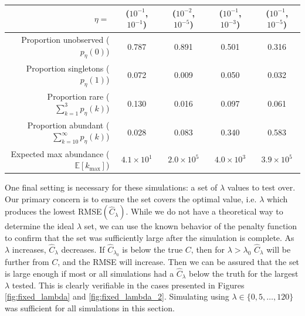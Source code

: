 \documentclass[oupdraft]{bio}
\begin{document}
\begin{table}[t]
\centering
\footnotesize
\begin{tabular}{rcccc}
  \hline
 $\eta = $ & ($10^{-1}$, $10^{-1}$) & ($10^{-2}$, $10^{-5}$) & ($10^{-1}$, $10^{-3}$) & ($10^{-1}$, $10^{-5}$) \\ 
  \hline
  Proportion unobserved ($p_{\eta}(0)$) & 0.787 & 0.891 & 0.501 & 0.316 \\ 
  Proportion singletons ($p_{\eta}(1)$) & 0.072 & 0.009 & 0.050 & 0.032 \\ 
  Proportion rare ($\sum_{k=1}^3 p_{\eta}(k)$) & 0.130 & 0.016 & 0.097 & 0.061 \\ 
  Proportion abundant ($\sum_{k=10}^{\infty} p_{\eta}(k)$) & 0.028 & 0.083 & 0.340 & 0.583 \\ 
Expected max abundance ($\mathbb{E}\left[k_{\text{max}}\right]$) & $4.1 \times 10^{1}$ & $2.0 \times 10^{5}$ & $4.0 \times 10^{3}$ & $3.9 \times 10^{5}$ \\ 
   \hline
\end{tabular}
\normalsize
\end{table}
One final setting is necessary for these simulations: a set of $\lambda$ values to test over.  Our primary concern is to ensure the set covers the optimal value, i.e. $\lambda$ which produces the lowest RMSE$(\widehat{C}_{\lambda})$.  While we do not have a theoretical way to determine the ideal $\lambda$ set, we can use the known behavior of the penalty function to confirm that the set was sufficiently large after the simulation is complete.  As $\lambda$ increases, $\widehat{C}_{\lambda}$ decreases.  If $\widehat{C}_{\lambda_0}$ is  below the true $C$, then for $\lambda > \lambda_0$ $\widehat{C}_{\lambda}$ will be further from $C$, and the RMSE will increase.  Then we can be assured that the set is large enough if most or all simulations had a $\widehat{C}_{\lambda}$ below the truth for the largest $\lambda$ tested.  This is clearly verifiable in the cases presented in Figures \ref{fig:fixed_lambda} and \ref{fig:fixed_lambda_2}. Simulating using $\lambda \in \{0, 5, \dots , 120\}$ was sufficient for all simulations in this section.
\end{document}
